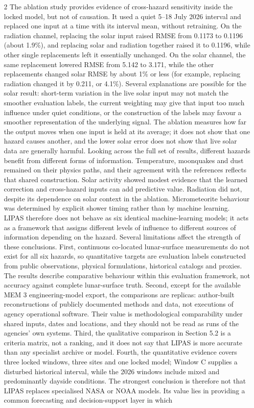 \begin{multicols}{2}
The ablation study provides evidence of cross-hazard sensitivity inside the locked model, but not of causation. It used a quiet 5--18 July 2026 interval and replaced one input at a time with its interval mean, without retraining. On the radiation channel, replacing the solar input raised RMSE from 0.1173 to 0.1196 (about 1.9\%), and replacing solar and radiation together raised it to 0.1196, while other single replacements left it essentially unchanged. On the solar channel, the same replacement lowered RMSE from 5.142 to 3.171, while the other replacements changed solar RMSE by about 1\% or less (for example, replacing radiation changed it by 0.211, or 4.1\%). Several explanations are possible for the solar result: short-term variation in the live solar input may not match the smoother evaluation labels, the current weighting may give that input too much influence under quiet conditions, or the construction of the labels may favour a smoother representation of the underlying signal. The ablation measures how far the output moves when one input is held at its average; it does not show that one hazard causes another, and the lower solar error does not show that live solar data are generally harmful. Looking across the full set of results, different hazards benefit from different forms of information. Temperature, moonquakes and dust remained on their physics paths, and their agreement with the references reflects that shared construction. Solar activity showed modest evidence that the learned correction and cross-hazard inputs can add predictive value. Radiation did not, despite its dependence on solar context in the ablation. Micrometeorite behaviour was determined by explicit shower timing rather than by machine learning. LIPAS therefore does not behave as six identical machine-learning models; it acts as a framework that assigns different levels of influence to different sources of information depending on the hazard. Several limitations affect the strength of these conclusions. First, continuous co-located lunar-surface measurements do not exist for all six hazards, so quantitative targets are evaluation labels constructed from public observations, physical formulations, historical catalogs and proxies. The results describe comparative behaviour within this evaluation framework, not accuracy against complete lunar-surface truth. Second, except for the available MEM 3 engineering-model export, the comparisons are replicas: author-built reconstructions of publicly documented methods and data, not executions of agency operational software. Their value is methodological comparability under shared inputs, dates and locations, and they should not be read as runs of the agencies' own systems. Third, the qualitative comparison in Section 5.2 is a criteria matrix, not a ranking, and it does not say that LIPAS is more accurate than any specialist archive or model. Fourth, the quantitative evidence covers three locked windows, three sites and one locked model; Window C supplies a disturbed historical interval, while the 2026 windows include mixed and predominantly dayside conditions. The strongest conclusion is therefore not that LIPAS replaces specialised NASA or NOAA models. Its value lies in providing a common forecasting and decision-support layer in which 
\end{multicols}
